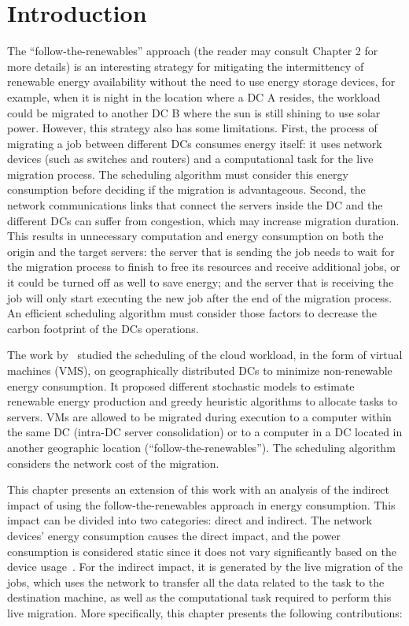 \section{Introduction}

The ``follow-the-renewables'' approach (the reader may consult Chapter 2 for more details) is an interesting strategy for mitigating the intermittency of renewable energy availability without the need to use energy storage devices, for example, when it is night in the location where a DC A resides, the workload could be migrated to another DC B where the sun is still shining to use solar power. However, this strategy also has some limitations. First, the process of migrating a job between different DCs consumes energy itself: it uses network devices (such as switches and routers) and a computational task for the live migration process. The scheduling algorithm must consider this energy consumption before deciding if the migration is advantageous. Second, the network communications links that connect the servers inside the DC and the different DCs can suffer from congestion, which may increase migration duration. This results in unnecessary computation and energy consumption on both the origin and the target servers: the server that is sending the job needs to wait for the migration process to finish to free its resources and receive additional jobs, or it could be turned off as well to save energy; and the server that is receiving the job will only start executing the new job after the end of the migration process. An efficient scheduling algorithm must consider those factors to decrease the carbon footprint of the DCs operations.


The work by~\citet{SAGITTA,NEMESIS} studied the scheduling of the cloud workload, in the form of virtual machines (VMS), on geographically distributed DCs to minimize non-renewable energy consumption. It proposed different stochastic models to estimate renewable energy production and greedy heuristic algorithms to allocate tasks to servers. VMs are allowed to be migrated during execution to a computer within the same DC (intra-DC server consolidation)  or to a computer in a DC located in another geographic location (``follow-the-renewables''). The scheduling algorithm considers the network cost of the migration.


This chapter presents an extension of this work with an analysis of the indirect impact of using the follow-the-renewables approach in energy consumption. This impact can be divided into two categories: direct and indirect. The network devices' energy consumption causes the direct impact, and the power consumption is considered static since it does not vary significantly based on the device usage~\cite{energy_network_devices}. For the indirect impact, it is generated by the live migration of the jobs, which uses the network to transfer all the data related to the task to the destination machine, as well as the computational task required to perform this live migration. More specifically, this chapter presents the following contributions:


